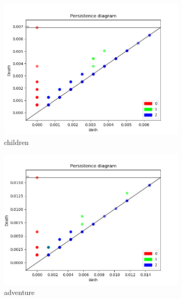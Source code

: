 \documentclass[fleqn]{article}
\begin{document}
\begin{figure}
\begin{subfigure}[t]{0.425\textwidth}
    	\includegraphics[width=\textwidth]{figures/all_words/children.png}
    	\caption{children}
        \label{fig:all:children}
    \end{subfigure}\hfill
	\begin{subfigure}[t]{0.425\textwidth}
    	\includegraphics[width=\textwidth]{figures/all_words/adventure.png}
    	\caption{adventure}
        \label{fig:all:adventure}
    \end{subfigure}\hfill
    \\
	\begin{subfigure}[t]{0.425\textwidth}

\end{subfigure}
\end{figure}
\end{document}
